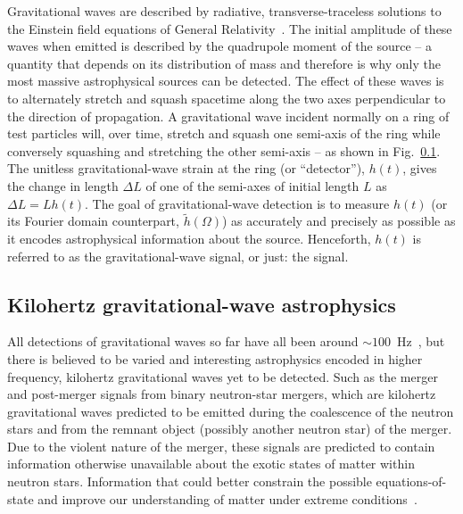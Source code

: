 Gravitational waves are described by radiative, transverse-traceless solutions to the Einstein field equations of General Relativity~\cite{}. %
The initial amplitude of these waves when emitted is described by the quadrupole moment of the source -- a quantity that depends on its distribution of mass and therefore is why only the most massive astrophysical sources can be detected. %
The effect of these waves is to alternately stretch and squash spacetime along the two axes perpendicular to the direction of propagation. A gravitational wave incident normally on a ring of test particles will, over time, stretch and squash one semi-axis of the ring while conversely squashing and stretching the other semi-axis -- as shown in Fig.~\ref{}.
The unitless gravitational-wave strain at the ring (or ``detector''), $h(t)$, gives the change in length $\Delta L$ of one of the semi-axes of initial length $L$ as $\Delta L = L h(t)$. The goal of gravitational-wave detection is to measure $h(t)$ (or its Fourier domain counterpart, $\tilde{h}(\Omega)$) as accurately and precisely as possible as it encodes astrophysical information about the source. Henceforth, $h(t)$ is referred to as the gravitational-wave signal, or just: the signal.



\subsection{Kilohertz gravitational-wave astrophysics} %

All detections of gravitational waves so far have all been around $\sim100$~Hz~\cite{}, but there is believed to be varied and interesting astrophysics encoded in higher frequency, kilohertz gravitational waves yet to be detected.
Such as the merger and post-merger signals from binary neutron-star mergers, which are kilohertz gravitational waves predicted to be emitted during the coalescence of the neutron stars and from the remnant object (possibly another neutron star) of the merger.
Due to the violent nature of the merger, these signals are predicted to contain information otherwise unavailable about the exotic states of matter within neutron stars. Information that could better constrain the possible equations-of-state and improve our understanding of matter under extreme conditions~\cite{miaoDesignGravitationalWaveDetectors2018,}. %

